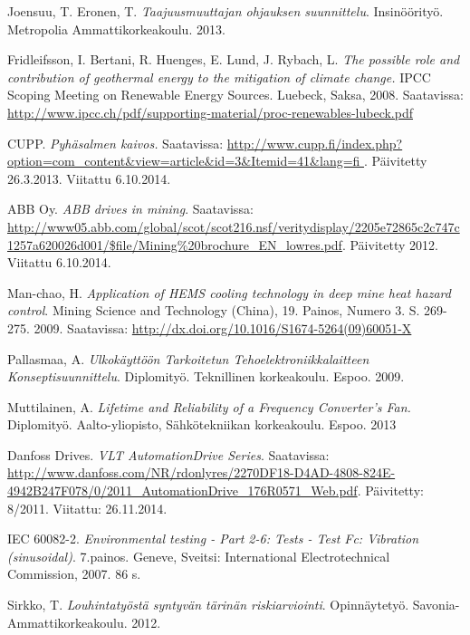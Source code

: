 \documentclass[finnish,12pt,a4paper,pdftex,elec,utf8]{aaltothesis}
\begin{document}
\begin{thebibliography}{99}
Joensuu, T. Eronen, T. \textit{Taajuusmuuttajan ohjauksen suunnittelu}. Insinöörityö. Metropolia Ammattikorkeakoulu. 2013.%

Fridleifsson, I. Bertani, R. Huenges, E. Lund, J. Rybach, L. \textit{The possible role and contribution of geothermal energy to the mitigation of climate change.} IPCC Scoping Meeting on Renewable Energy Sources. Luebeck, Saksa, 2008. Saatavissa: \url{http://www.ipcc.ch/pdf/supporting-material/proc-renewables-lubeck.pdf}

CUPP. \textit{Pyhäsalmen kaivos.} Saatavissa: \url{http://www.cupp.fi/index.php?option=com_content&view=article&id=3&Itemid=41&lang=fi	}. Päivitetty 26.3.2013. Viitattu 6.10.2014.

ABB Oy. \textit{ABB drives in mining}. Saatavissa: \url{http://www05.abb.com/global/scot/scot216.nsf/veritydisplay/2205e72865c2c747c1257a620026d001/$file/Mining%20brochure_EN_lowres.pdf}. Päivitetty 2012. Viitattu 6.10.2014.

Man-chao, H. \textit{Application of HEMS cooling technology in deep mine heat hazard control}. Mining Science and Technology (China), 19. Painos, Numero 3. S. 269-275. 2009. Saatavissa: \url{http://dx.doi.org/10.1016/S1674-5264(09)60051-X}

Pallasmaa, A. \textit{Ulkokäyttöön Tarkoitetun Tehoelektroniikkalaitteen Konseptisuunnittelu}. Diplomityö. Teknillinen korkeakoulu. Espoo. 2009.

Muttilainen, A. \textit{Lifetime and Reliability of a Frequency Converter’s Fan.} Diplomityö. Aalto-yliopisto, Sähkötekniikan korkeakoulu. Espoo. 2013

Danfoss Drives. \textit{VLT AutomationDrive Series}. Saatavissa: \url{http://www.danfoss.com/NR/rdonlyres/2270DF18-D4AD-4808-824E-4942B247F078/0/2011_AutomationDrive_176R0571_Web.pdf}. Päivitetty: 8/2011. Viitattu: 26.11.2014.

IEC 60082-2. \textit{Environmental testing - Part 2-6: Tests - Test Fc: Vibration (sinusoidal)}. 7.painos. Geneve, Sveitsi: International Electrotechnical Commission, 2007. 86 s.

Sirkko, T. \textit{Louhintatyöstä syntyvän tärinän riskiarviointi}. Opinnäytetyö. Savonia-Ammattikorkeakoulu. 2012.


\end{thebibliography}
\end{document}
